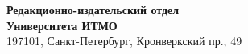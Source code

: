 \thispagestyle{empty}
\addtocounter{page}{-1}

\vspace*{\fill}

\noindent
\textbf{Редакционно-издательский отдел} \\ 
\textbf{Университета ИТМО} \\
197101, Санкт-Петербург, Кронверкский пр., 49
